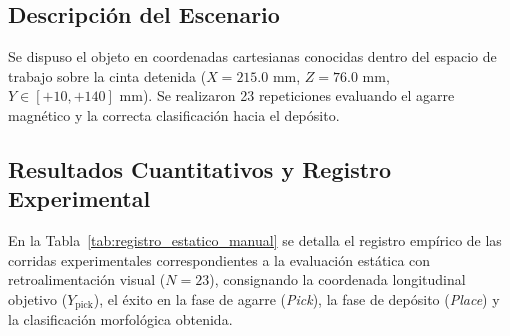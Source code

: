 \documentclass[12pt, a4paper]{report}
\begin{document}
\subsection{Descripción del Escenario}
Se dispuso el objeto en coordenadas cartesianas conocidas dentro del espacio de trabajo sobre la cinta detenida ($X = 215.0\text{ mm}$, $Z = 76.0\text{ mm}$, $Y \in [+10, +140]\text{ mm}$). Se realizaron 23 repeticiones evaluando el agarre magnético y la correcta clasificación hacia el depósito.

\subsection{Resultados Cuantitativos y Registro Experimental}
En la Tabla~\ref{tab:registro_estatico_manual} se detalla el registro empírico de las corridas experimentales correspondientes a la evaluación estática con retroalimentación visual ($N = 23$), consignando la coordenada longitudinal objetivo ($Y_{\text{pick}}$), el éxito en la fase de agarre (\textit{Pick}), la fase de depósito (\textit{Place}) y la clasificación morfológica obtenida.
\end{document}
